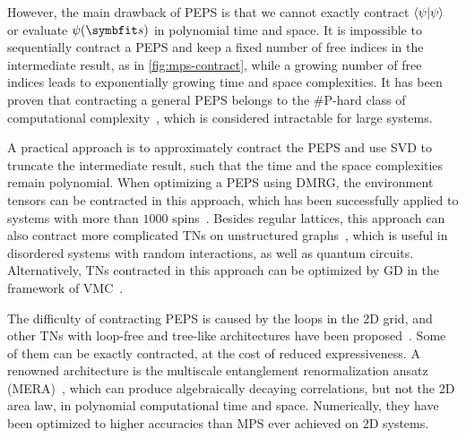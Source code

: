 However, the main drawback of PEPS is that we cannot exactly contract $\ip{\psi}$ or evaluate $\psi(\vs)$ in polynomial time and space. It is impossible to sequentially contract a PEPS and keep a fixed number of free indices in the intermediate result, as in \cref{fig:mps-contract}, while a growing number of free indices leads to exponentially growing time and space complexities. It has been proven that contracting a general PEPS belongs to the \#P-hard class of computational complexity~\cite{schuch2007computational}, which is considered intractable for large systems.

A practical approach is to approximately contract the PEPS and use SVD to truncate the intermediate result, such that the time and the space complexities remain polynomial. When optimizing a PEPS using DMRG, the environment tensors can be contracted in this approach, which has been successfully applied to systems with more than $1000$ spins~\cite{stoudenmire2012annual, lubasch2014algorithms, vanderstraeten2022variational}. Besides regular lattices, this approach can also contract more complicated TNs on unstructured graphs~\cite{jermyn2020automatic, pan2020contracting, sahu2022efficient}, which is useful in disordered systems with random interactions, as well as quantum circuits. Alternatively, TNs contracted in this approach can be optimized by GD in the framework of VMC~\cite{schuch2008simulation, mezzacapo2009ground, vanderstraeten2016gradient}.

The difficulty of contracting PEPS is caused by the loops in the 2D grid, and other TNs with loop-free and tree-like architectures have been proposed~\cite{shi2006classical, silvi2010homogeneous, cheng2019tree, felser2021efficient}. Some of them can be exactly contracted, at the cost of reduced expressiveness. A renowned architecture is the multiscale entanglement renormalization ansatz (MERA)~\cite{vidal2007entanglement, qian2022tree}, which can produce algebraically decaying correlations, but not the 2D area law, in polynomial computational time and space. Numerically, they have been optimized to higher accuracies than MPS ever achieved on 2D systems.
